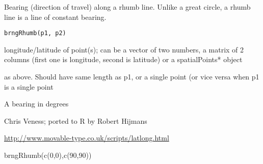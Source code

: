\begin{Description}\relax
Bearing (direction of travel) along a rhumb line. Unlike a great circle, a rhumb line is a line of constant bearing.
\end{Description}
\begin{Usage}
\begin{verbatim}
brngRhumb(p1, p2)
\end{verbatim}
\end{Usage}
\begin{Arguments}
\begin{ldescription}
\item[\code{p1}] longitude/latitude of point(s); can be a vector of two numbers, a matrix of 2 columns (first one is longitude, second is latitude) or a spatialPoints* object
\item[\code{p2}] as above. Should have same length as p1, or a single point (or vice versa when p1 is a single point
\end{ldescription}
\end{Arguments}
\begin{Value}
A bearing in degrees
\end{Value}
\begin{Author}\relax
Chris Veness; ported to R by Robert Hijmans
\end{Author}
\begin{References}\relax
\url{http://www.movable-type.co.uk/scripts/latlong.html}
\end{References}
\begin{SeeAlso}\relax
{}
\end{SeeAlso}
\begin{Examples}
\begin{ExampleCode}
brngRhumb(c(0,0),c(90,90))
\end{ExampleCode}
\end{Examples}

